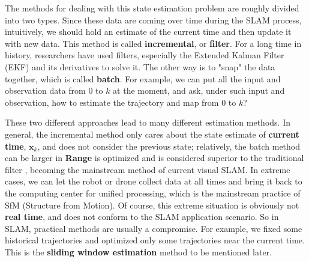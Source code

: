 The methods for dealing with this state estimation problem are roughly divided into two types. Since these data are coming over time during the SLAM process, intuitively, we should hold an estimate of the current time and then update it with new data. This method is called \textbf{incremental}, or \textbf{filter}. For a long time in history, researchers have used filters, especially the Extended Kalman Filter (EKF) and its derivatives to solve it. The other way is to "snap" the data together, which is called \textbf{batch}. For example, we can put all the input and observation data from 0 to $k$ at the moment, and ask, under such input and observation, how to estimate the trajectory and map from 0 to $k$?

These two different approaches lead to many different estimation methods. In general, the incremental method only cares about the state estimate of \textbf{current time}, $\bm{x}_k$, and does not consider the previous state; relatively, the batch method can be larger in \textbf{ Range} is optimized and is considered superior to the traditional filter \textsuperscript{\cite{Strasdat2012}}, becoming the mainstream method of current visual SLAM. In extreme cases, we can let the robot or drone collect data at all times and bring it back to the computing center for unified processing, which is the mainstream practice of SfM (Structure from Motion). Of course, this extreme situation is obviously not \textbf{real time}, and does not conform to the SLAM application scenario. So in SLAM, practical methods are usually a compromise. For example, we fixed some historical trajectories and optimized only some trajectories near the current time. This is the \textbf{sliding window estimation} method to be mentioned later.

